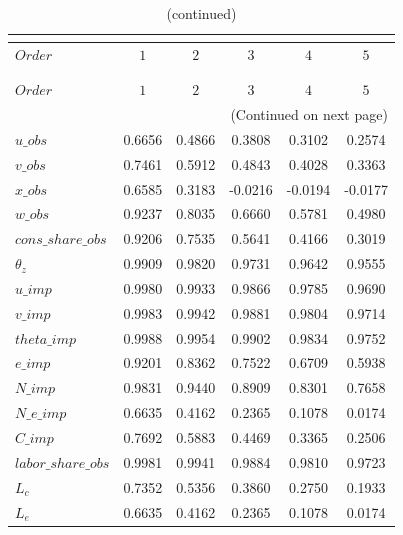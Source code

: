  
\begin{center}
\begin{longtable}{lccccc} 
\caption{COEFFICIENTS OF AUTOCORRELATION}\\
 \label{Table:th_autocorr_matrix}\\
\toprule 
$Order              $	 & 	 $         1$	 & 	 $         2$	 & 	 $         3$	 & 	 $         4$	 & 	 $         5$\\
\midrule \endfirsthead 
\caption{(continued)}\\
 \toprule \\ 
$Order              $	 & 	 $         1$	 & 	 $         2$	 & 	 $         3$	 & 	 $         4$	 & 	 $         5$\\
\midrule \endhead 
\midrule \multicolumn{6}{r}{(Continued on next page)} \\ \bottomrule \endfoot 
\bottomrule \endlastfoot 
$u\_obs             $	 & 	    0.6656	 & 	    0.4866	 & 	    0.3808	 & 	    0.3102	 & 	    0.2574 \\ 
$v\_obs             $	 & 	    0.7461	 & 	    0.5912	 & 	    0.4843	 & 	    0.4028	 & 	    0.3363 \\ 
$x\_obs             $	 & 	    0.6585	 & 	    0.3183	 & 	   -0.0216	 & 	   -0.0194	 & 	   -0.0177 \\ 
$w\_obs             $	 & 	    0.9237	 & 	    0.8035	 & 	    0.6660	 & 	    0.5781	 & 	    0.4980 \\ 
$cons\_share\_obs   $	 & 	    0.9206	 & 	    0.7535	 & 	    0.5641	 & 	    0.4166	 & 	    0.3019 \\ 
${\theta_z}         $	 & 	    0.9909	 & 	    0.9820	 & 	    0.9731	 & 	    0.9642	 & 	    0.9555 \\ 
$u\_imp             $	 & 	    0.9980	 & 	    0.9933	 & 	    0.9866	 & 	    0.9785	 & 	    0.9690 \\ 
$v\_imp             $	 & 	    0.9983	 & 	    0.9942	 & 	    0.9881	 & 	    0.9804	 & 	    0.9714 \\ 
$theta\_imp         $	 & 	    0.9988	 & 	    0.9954	 & 	    0.9902	 & 	    0.9834	 & 	    0.9752 \\ 
$e\_imp             $	 & 	    0.9201	 & 	    0.8362	 & 	    0.7522	 & 	    0.6709	 & 	    0.5938 \\ 
$N\_imp             $	 & 	    0.9831	 & 	    0.9440	 & 	    0.8909	 & 	    0.8301	 & 	    0.7658 \\ 
$N\_e\_imp          $	 & 	    0.6635	 & 	    0.4162	 & 	    0.2365	 & 	    0.1078	 & 	    0.0174 \\ 
$C\_imp             $	 & 	    0.7692	 & 	    0.5883	 & 	    0.4469	 & 	    0.3365	 & 	    0.2506 \\ 
$labor\_share\_obs  $	 & 	    0.9981	 & 	    0.9941	 & 	    0.9884	 & 	    0.9810	 & 	    0.9723 \\ 
${L_c}              $	 & 	    0.7352	 & 	    0.5356	 & 	    0.3860	 & 	    0.2750	 & 	    0.1933 \\ 
${L_e}              $	 & 	    0.6635	 & 	    0.4162	 & 	    0.2365	 & 	    0.1078	 & 	    0.0174 \\ 
\end{longtable}
 \end{center}
